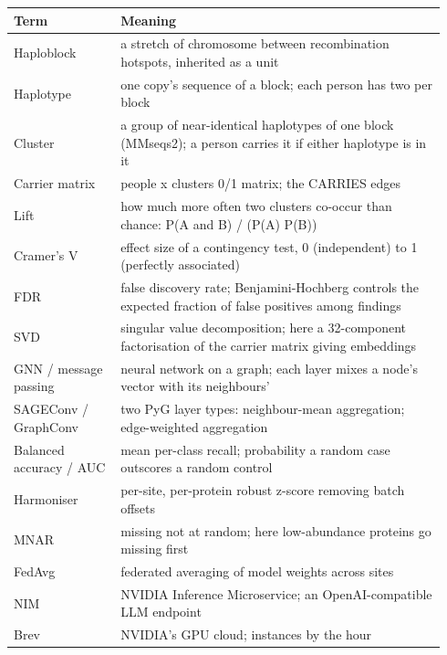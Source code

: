 \documentclass[11pt,a4paper]{article}
\begin{document}
\begin{longtable}{p{0.235\linewidth}p{0.705\linewidth}}
\toprule
\textbf{Term} & \textbf{Meaning} \\
\midrule
\endhead
Haploblock & a stretch of chromosome between recombination hotspots, inherited as a unit \\
Haplotype & one copy's sequence of a block; each person has two per block \\
Cluster & a group of near-identical haplotypes of one block (MMseqs2); a person carries it if either haplotype is in it \\
Carrier matrix & people x clusters 0/1 matrix; the CARRIES edges \\
Lift & how much more often two clusters co-occur than chance: P(A and B) / (P(A) P(B)) \\
Cramer's V & effect size of a contingency test, 0 (independent) to 1 (perfectly associated) \\
FDR & false discovery rate; Benjamini-Hochberg controls the expected fraction of false positives among findings \\
SVD & singular value decomposition; here a 32-component factorisation of the carrier matrix giving embeddings \\
GNN / message passing & neural network on a graph; each layer mixes a node's vector with its neighbours' \\
SAGEConv / GraphConv & two PyG layer types: neighbour-mean aggregation; edge-weighted aggregation \\
Balanced accuracy / AUC & mean per-class recall; probability a random case outscores a random control \\
Harmoniser & per-site, per-protein robust z-score removing batch offsets \\
MNAR & missing not at random; here low-abundance proteins go missing first \\
FedAvg & federated averaging of model weights across sites \\
NIM & NVIDIA Inference Microservice; an OpenAI-compatible LLM endpoint \\
Brev & NVIDIA's GPU cloud; instances by the hour \\
\bottomrule
\end{longtable}
\end{document}
